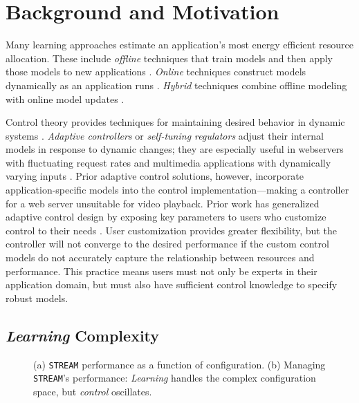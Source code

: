 \section{Background and Motivation}
\label{sec:example}
Many learning approaches estimate an application's most energy
efficient resource allocation.  These include \emph{offline}
techniques that train models and then apply those models to new
applications
\cite{Yi2003,LeeBrooks2006,CPR,reddiHPCA2013,PUPiL,quasar}.
\emph{Online} techniques construct models dynamically as an
application runs
\cite{Li2006,Flicker,ParallelismDial,Ponamarev,LeeBrooks}.
\emph{Hybrid} techniques combine offline modeling with online model
updates \cite{packandcap,Winter2010,dubach2010,Koala,Cinder,
  wu2012inferred,LEO}.

Control theory provides techniques for maintaining desired behavior in
dynamic systems \cite{Hellerstein2004a}. \emph{Adaptive controllers}
or \emph{self-tuning regulators} adjust their internal models in
response to dynamic changes; they are especially useful in webservers
with fluctuating request rates
\cite{Horvarth,LuEtAl-2006a,SunDaiPan-2008a} and multimedia
applications with dynamically varying inputs
\cite{TCST,Agilos,grace2}.  Prior adaptive control solutions, however,
incorporate application-specific models into the control
implementation---making a controller for a web server unsuitable for
video playback.  Prior work has generalized adaptive control design by
exposing key parameters to users who customize control to their needs
\cite{ControlWare,POET}.  User customization provides greater
flexibility, but the controller will not converge to the desired
performance if the custom control models do not accurately capture the
relationship between resources and performance.  This practice means
users must not only be experts in their application domain, but must
also have sufficient control knowledge to specify robust models.

\subsection{\emph{Learning} Complexity}
\begin{figure}
\centering
  \subfloat[]
  {
    
    \label{fig:STREAM_timeline}
  }
  \caption{(a) \texttt{STREAM} performance as a function of
    configuration.  (b) Managing \texttt{STREAM}'s performance:
    \emph{Learning} handles the complex configuration space, but
    \emph{control} oscillates.}
  \label{fig:learning-models1}
\end{figure}

